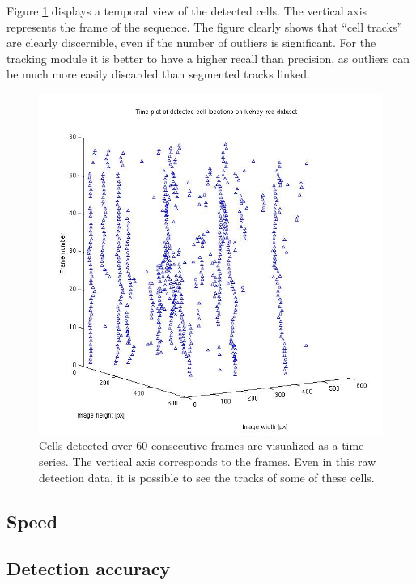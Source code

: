 		
		Figure \ref{fig:cell_tracks_detection} displays a temporal view of the detected cells. The vertical axis represents the frame of the sequence. The figure clearly shows that ``cell tracks'' are clearly discernible, even if the number of outliers is significant. For the tracking module it is better to have a higher recall than precision, as outliers can be much more easily discarded than segmented tracks linked.
		\begin{figure}
			  \includegraphics[width=\textwidth]{images/cell_tracks}
			\caption{Cells detected over 60 consecutive frames are visualized as a time series. The vertical axis corresponds to the frames. Even in this raw detection data, it is possible to see the tracks of some of these cells.}
		    \label{fig:cell_tracks_detection}
		\end{figure}
		
		\subsection{Speed \statusnew}
		
		\subsection{Detection accuracy \statusnew}
			
